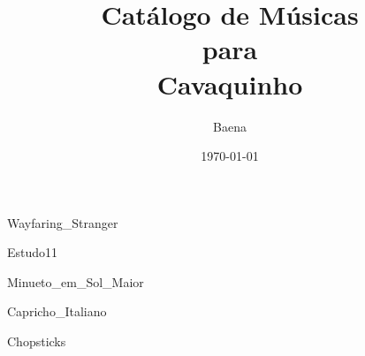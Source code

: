 \documentclass{scrartcl}
\begin{document}
\title{\textbf{\Huge Catálogo de Músicas\\ \vspace{1cm} para\\ \vspace{1cm} Cavaquinho}}
\author{Baena}
\date{\today}
\maketitle
\thispagestyle{empty}
\newpage

\setcounter{page}{1}

\begin{multicols}{2}
\tableofcontents
\end{multicols}

\cleardoublepage
{}
\setcounter{page}{1}







{Wayfaring_Stranger}




{Estudo11}


{Minueto_em_Sol_Maior}








{Capricho_Italiano}


{Chopsticks}
\end{document}
